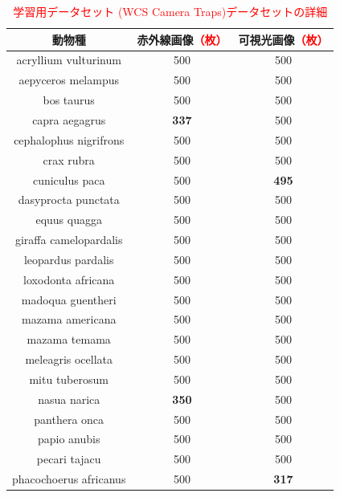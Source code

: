 \documentclass[a4paper,11pt,nomag]{jsreport}
\begin{document}
\begin{table}[tbp]
  \centering
  \caption{\textcolor{red}{学習用データセット (WCS Camera Traps)データセットの詳細}}
  \label{tbl:wcs}
  \begin{tabular}{c|c|c}
      \hline
      動物種                    & 赤外線画像\textcolor{red}{（枚）} & 可視光画像\textcolor{red}{（枚）} \\ \hline\hline
      acryllium vulturinum     & 500          & 500          \\
      aepyceros melampus       & 500          & 500          \\
      bos taurus               & 500          & 500          \\
      capra aegagrus           & \textbf{337} & 500          \\
      cephalophus nigrifrons   & 500          & 500          \\
      crax rubra               & 500          & 500          \\
      cuniculus paca           & 500          & \textbf{495} \\
      dasyprocta punctata      & 500          & 500          \\
      equus quagga             & 500          & 500          \\
      giraffa camelopardalis   & 500          & 500          \\
      leopardus pardalis       & 500          & 500          \\
      loxodonta africana       & 500          & 500          \\
      madoqua guentheri        & 500          & 500          \\
      mazama americana         & 500          & 500          \\
      mazama temama            & 500          & 500          \\
      meleagris ocellata       & 500          & 500          \\
      mitu tuberosum           & 500          & 500          \\
      nasua narica             & \textbf{350} & 500          \\
      panthera onca            & 500          & 500          \\
      papio anubis             & 500          & 500          \\
      pecari tajacu            & 500          & 500          \\
      phacochoerus africanus   & 500          & \textbf{317} \\

\end{tabular}
\end{table}
\end{document}
